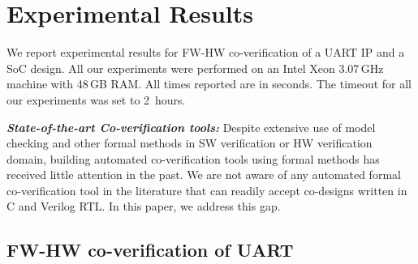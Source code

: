 \documentclass[sigconf]{acmart}
\begin{document}
\section{Experimental Results}
%
We report experimental results for FW-HW co-verification of a UART IP and a
SoC design.  All our experiments were performed on an Intel Xeon 3.07\,GHz
machine with 48\,GB RAM.  All times reported are in seconds.  The timeout 
for all our experiments was set to 2~hours.  
%

\textit{\textbf{State-of-the-art Co-verification tools:}} 
%
Despite extensive use of model checking and other formal methods in 
SW verification or HW verification domain, building automated 
co-verification tools using formal methods has received 
little attention in the past.  We are not aware of any automated 
formal co-verification tool in the literature that can readily accept 
co-designs written in C and Verilog RTL. In this paper, we address this gap. 
%
\subsection{FW-HW co-verification of UART}
\end{document}
